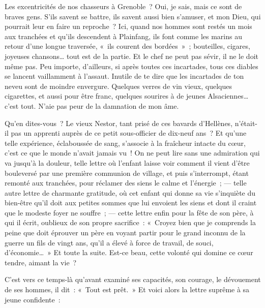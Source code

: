 \documentclass[french,twoside]{book} %
\newenvironment{quoteblock}%
  {\begin{quoting}}
  {\end{quoting}}
\newenvironment{quotebar}{%
    \def\FrameCommand{{\color{rubric!10!}\vrule width 0.5em} \hspace{0.9em}}%
    \def\OuterFrameSep{\itemsep} %
    \MakeFramed {\advance\hsize-\width \FrameRestore}
  }%
  {%
    \endMakeFramed
  }
\renewenvironment{quoteblock}%
  {%
    \savenotes
    \setstretch{0.9}
    \normalfont
    \begin{quotebar}
  }
  {%
    \end{quotebar}
    \spewnotes
  }
\begin{document}
\begin{quoteblock}
 \noindent Les excentricités de nos chasseurs à Grenoble ? Oui, je sais, mais ce sont de braves gens. S’ils savent se battre, ils savent aussi bien s’amuser, et mon Dieu, qui pourrait leur en faire un reproche ? Ici, quand nos hommes sont restés un mois aux tranchées et qu’ils descendent à Plainfang, ils font comme les marins au retour d’une longue traversée, « ils courent des bordées » ; bouteilles, cigares, joyeuses chansons… tout est de la partie. Et le chef ne peut pas sévir, il ne le doit même pas. Peu importe, d’ailleurs, si après toutes ces incartades, tous ces diables se lancent vaillamment à l’assaut. Inutile de te dire que les incartades de ton neveu sont de moindre envergure. Quelques verres de vin vieux, quelques cigarettes, et aussi pour être franc, quelques sourires à de jeunes Alsaciennes… c’est tout. N’aie pas peur de la damnation de mon âme.‌
 \end{quoteblock}

\noindent Qu’en dites-vous ? Le vieux Nestor, tant prisé de ces bavards d’Hellènes, n’était-il pas un apprenti auprès de ce petit sous-officier de dix-neuf ans ? Et qu’une telle expérience, éclaboussée de sang, s’associe à la fraîcheur intacte du cœur, c’est ce que le monde n’avait jamais vu ! On ne peut lire sans une admiration qui va jusqu’à la douleur, telle lettre où l’enfant laisse voir comment il vient d’être bouleversé par une première communion de village, et puis s’interrompt, étant remonté aux tranchées, pour réclamer des siens le calme et l’énergie ; — telle autre lettre de charmante gratitude, où cet enfant qui donne sa vie s’inquiète du bien-être qu’il doit aux petites sommes que lui envoient les siens et dont il craint que le modeste foyer ne souffre ; — cette lettre enfin pour la fête de son père, à qui il écrit, oublieux de son propre sacrifice : « Croyez bien que je comprends la peine que doit éprouver un père en voyant partir pour le grand inconnu de la guerre un fils de vingt ans, qu’il a élevé à force de travail, de souci, d’économie… » Et toute la suite. Est-ce beau, cette volonté qui domine ce cœur tendre, aimant la vie ?‌\par
C’est vers ce temps-là qu’avant examiné ses capacités, son courage, le dévouement de ses hommes, il dit : « Tout est prêt. » Et voici alors la lettre suprême à sa jeune confidente :‌\par
\end{document}
